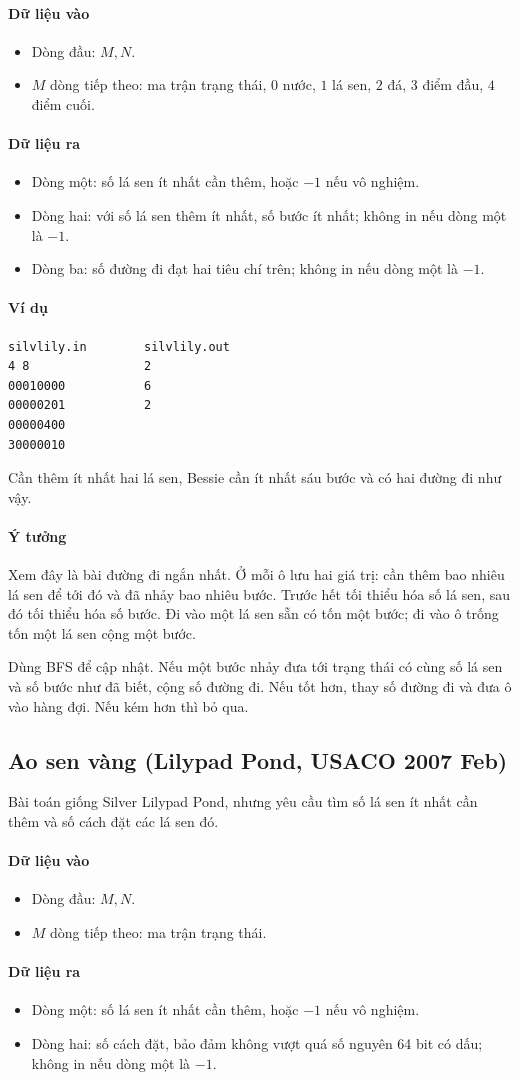 \documentclass[11pt]{article}
\newcommand{\problem}[1]{\subsection{#1}}
\newcommand{\iosec}[1]{\paragraph{#1}}
\begin{document}
\iosec{Dữ liệu vào}
\begin{itemize}
  \item Dòng đầu: \(M,N\).
  \item \(M\) dòng tiếp theo: ma trận trạng thái, \(0\) nước, \(1\) lá sen, \(2\) đá, \(3\) điểm đầu, \(4\) điểm cuối.
\end{itemize}

\iosec{Dữ liệu ra}
\begin{itemize}
  \item Dòng một: số lá sen ít nhất cần thêm, hoặc \(-1\) nếu vô nghiệm.
  \item Dòng hai: với số lá sen thêm ít nhất, số bước ít nhất; không in nếu dòng một là \(-1\).
  \item Dòng ba: số đường đi đạt hai tiêu chí trên; không in nếu dòng một là \(-1\).
\end{itemize}

\iosec{Ví dụ}
\begin{verbatim}
silvlily.in        silvlily.out
4 8                2
00010000           6
00000201           2
00000400
30000010
\end{verbatim}

Cần thêm ít nhất hai lá sen, Bessie cần ít nhất sáu bước và có hai đường đi như vậy.

\iosec{Ý tưởng}
Xem đây là bài đường đi ngắn nhất. Ở mỗi ô lưu hai giá trị: cần thêm bao nhiêu lá sen để tới đó và đã nhảy bao nhiêu bước. Trước hết tối thiểu hóa số lá sen, sau đó tối thiểu hóa số bước. Đi vào một lá sen sẵn có tốn một bước; đi vào ô trống tốn một lá sen cộng một bước.

Dùng BFS để cập nhật. Nếu một bước nhảy đưa tới trạng thái có cùng số lá sen và số bước như đã biết, cộng số đường đi. Nếu tốt hơn, thay số đường đi và đưa ô vào hàng đợi. Nếu kém hơn thì bỏ qua.

\problem{Ao sen vàng (Lilypad Pond, USACO 2007 Feb)}

Bài toán giống Silver Lilypad Pond, nhưng yêu cầu tìm số lá sen ít nhất cần thêm và số cách đặt các lá sen đó.

\iosec{Dữ liệu vào}
\begin{itemize}
  \item Dòng đầu: \(M,N\).
  \item \(M\) dòng tiếp theo: ma trận trạng thái.
\end{itemize}

\iosec{Dữ liệu ra}
\begin{itemize}
  \item Dòng một: số lá sen ít nhất cần thêm, hoặc \(-1\) nếu vô nghiệm.
  \item Dòng hai: số cách đặt, bảo đảm không vượt quá số nguyên 64 bit có dấu; không in nếu dòng một là \(-1\).
\end{itemize}
\end{document}

